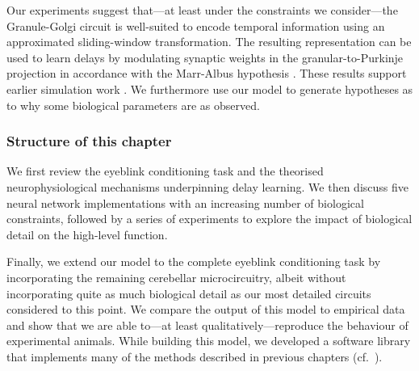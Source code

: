 Our experiments suggest that---at least under the constraints we consider---the Granule-Golgi circuit is well-suited to encode temporal information using an approximated sliding-window transformation.
The resulting representation can be used to learn delays by modulating synaptic weights in the granular-to-Purkinje projection in accordance with the Marr-Albus hypothesis \citep{marr1969theory,albus1971theory,sanger2020expansion}.
These results support earlier simulation work \citep{rossert2015edge}.
We furthermore use our model to generate hypotheses as to why some biological parameters are as observed.

\subsubsection{Structure of this chapter}
We first review the eyeblink conditioning task
and the theorised neurophysiological mechanisms underpinning delay learning.
We then discuss five neural network implementations with an increasing number of biological constraints, followed by a series of experiments to explore the impact of biological detail on the high-level function.

Finally, we extend our model to the complete eyeblink conditioning task by incorporating the remaining cerebellar microcircuitry, albeit without incorporating quite as much biological detail as our most detailed circuits considered to this point.
We compare the output of this model to empirical data and show that we are able to---at least qualitatively---reproduce the behaviour of experimental animals.
While building this model, we developed a software library that implements many of the methods described in previous chapters (cf.~).